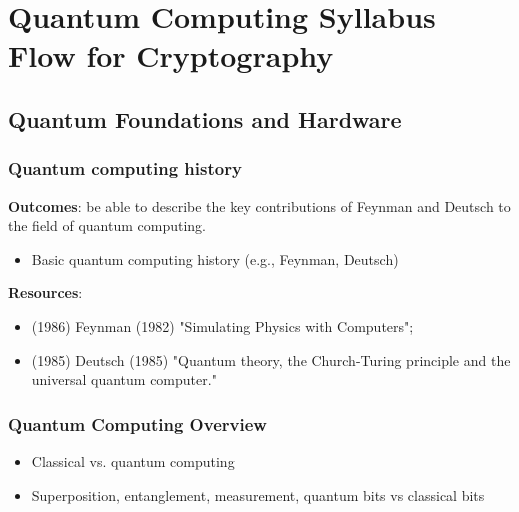 \section{Quantum Computing Syllabus Flow for Cryptography}


\subsection{Quantum Foundations and Hardware}


\subsubsection{Quantum computing history}

\textbf{Outcomes}: be able to describe the key contributions of Feynman and Deutsch to the field of quantum computing.

\begin{itemize}
	\item Basic quantum computing history (e.g., Feynman, Deutsch)
\end{itemize}

\textbf{Resources}:

\begin{itemize}
	\item \citeauthor{Feynman:1986} (1986)  Feynman (1982) "Simulating Physics with Computers"; 

	\item \citeauthor{Deutsch:1985} (1985)  Deutsch (1985) "Quantum theory, the Church-Turing principle and the universal quantum computer."
\end{itemize}


\subsubsection{Quantum Computing Overview}

\begin{itemize}
	\item Classical vs. quantum computing
	\item Superposition, entanglement, measurement, quantum bits vs classical bits
\end{itemize}
	

